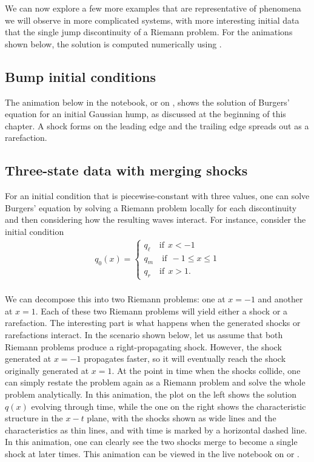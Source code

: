 \documentclass{SIAMbook2016}
\begin{document}
We can now explore a few more examples that are representative of
phenomena we will observe in more complicated systems, with more
interesting initial data that the single jump discontinuity of a Riemann
problem. For the animations shown below, the solution is computed
numerically using .

\hypertarget{bump-initial-conditions}{%
\subsection{Bump initial conditions}\label{bump-initial-conditions}}

The animation below in the notebook, or on
, shows the solution of Burgers' equation for an initial
Gaussian hump, as discussed at the beginning of this chapter. A shock
forms on the leading edge and the trailing edge spreads out as a
rarefaction.

\hypertarget{three-state-data-with-merging-shocks}{%
\subsection{Three-state data with merging
shocks}\label{three-state-data-with-merging-shocks}}

For an initial condition that is piecewise-constant with three values,
one can solve Burgers' equation by solving a Riemann problem locally for
each discontinuity and then considering how the resulting waves
interact. For instance, consider the initial condition \begin{align*}
q_0(x) = 
\begin{cases}
q_\ell \quad \text{if} \ \ x < -1 \\
q_m \quad \text{if} \ \ -1\le x \le 1 \\
q_r \quad \text{if} \ \ x > 1.
\end{cases}
\end{align*}\\
We can decompose this into two Riemann problems: one at \(x=-1\) and
another at \(x=1\). Each of these two Riemann problems will yield either
a shock or a rarefaction. The interesting part is what happens when the
generated shocks or rarefactions interact. In the scenario shown below,
let us assume that both Riemann problems produce a right-propagating
shock. However, the shock generated at \(x=-1\) propagates faster, so it
will eventually reach the shock originally generated at \(x=1\). At the
point in time when the shocks collide, one can simply restate the
problem again as a Riemann problem and solve the whole problem
analytically. In this animation, the plot on the left shows the solution
\(q(x)\) evolving through time, while the one on the right shows the
characteristic structure in the \(x-t\) plane, with the shocks shown as
wide lines and the characteristics as thin lines, and with time is
marked by a horizontal dashed line. In this animation, one can clearly
see the two shocks merge to become a single shock at later times. This
animation can be viewed in the live notebook on or
.
\end{document}
